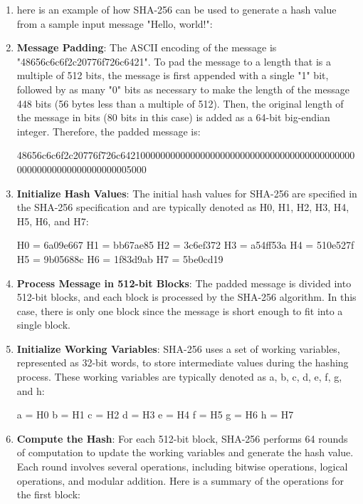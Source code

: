 \documentclass[openany]{book}
\begin{document}
\begin{enumerate}
    \item here is an example of how SHA-256 can be used to generate a hash value from a sample input message "Hello, world!":

    \item \textbf{Message Padding}: The ASCII encoding of the message is "48656c6c6f2c20776f726c6421". To pad the message to a length that is a multiple of 512 bits, the message is first appended with a single "1" bit, followed by as many "0" bits as necessary to make the length of the message 448 bits (56 bytes less than a multiple of 512). Then, the original length of the message in bits (80 bits in this case) is added as a 64-bit big-endian integer. Therefore, the padded message is:

          48656c6c6f2c20776f726c64210000000000000000000000000000000000000000000\\
          00000000000000000000005000

    \item \textbf{Initialize Hash Values}: The initial hash values for SHA-256 are specified in the SHA-256 specification and are typically denoted as H0, H1, H2, H3, H4, H5, H6, and H7:

          H0 = 6a09e667
          H1 = bb67ae85
          H2 = 3c6ef372
          H3 = a54ff53a
          H4 = 510e527f
          H5 = 9b05688c
          H6 = 1f83d9ab
          H7 = 5be0cd19

    \item \textbf{Process Message in 512-bit Blocks}: The padded message is divided into 512-bit blocks, and each block is processed by the SHA-256 algorithm. In this case, there is only one block since the message is short enough to fit into a single block.

    \item \textbf{Initialize Working Variables}: SHA-256 uses a set of working variables, represented as 32-bit words, to store intermediate values during the hashing process. These working variables are typically denoted as a, b, c, d, e, f, g, and h:

          a = H0
          b = H1
          c = H2
          d = H3
          e = H4
          f = H5
          g = H6
          h = H7

    \item \textbf{Compute the Hash}: For each 512-bit block, SHA-256 performs 64 rounds of computation to update the working variables and generate the hash value. Each round involves several operations, including bitwise operations, logical operations, and modular addition. Here is a summary of the operations for the first block:


\end{enumerate}
\end{document}
